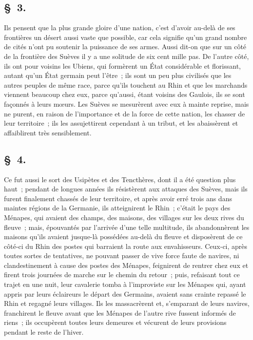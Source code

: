 \documentclass[french,twoside]{book} %
\begin{document}
\subsection[{§ 3.}]{ \textsc{§ 3.} }
\noindent Ils pensent que la plus grande gloire d’une nation, c’est d’avoir au-delà de ses frontières un désert aussi vaste que possible, car cela signifie qu’un grand nombre de cités n’ont pu soutenir la puissance de ses armes. Aussi dit-on que sur un côté de la frontière des Suèves il y a une solitude de six cent mille pas. De l’autre côté, ils ont pour voisins les Ubiens, qui formèrent un État considérable et florissant, autant qu’un État germain peut l’être ; ils sont un peu plus civilisés que les autres peuples de même race, parce qu’ils touchent au Rhin et que les marchands viennent beaucoup chez eux, parce qu’aussi, étant voisins des Gaulois, ils se sont façonnés à leurs mœurs. Les Suèves se mesurèrent avec eux à mainte reprise, mais ne purent, en raison de l’importance et de la force de cette nation, les chasser de leur territoire ; ils les assujettirent cependant à un tribut, et les abaissèrent et affaiblirent très sensiblement.
\subsection[{§ 4.}]{ \textsc{§ 4.} }
\noindent Ce fut aussi le sort des Usipètes et des Tencthères, dont il a été question plus haut ; pendant de longues années ils résistèrent aux attaques des Suèves, mais ils furent finalement chassés de leur territoire, et après avoir erré trois ans dans maintes régions de la Germanie, ils atteignirent le Rhin ; c’était le pays des Ménapes, qui avaient des champs, des maisons, des villages sur les deux rives du fleuve ; mais, épouvantés par l’arrivée d’une telle multitude, ils abandonnèrent les maisons qu’ils avaient jusque-là possédées au-delà du fleuve et disposèrent de ce côté-ci du Rhin des postes qui barraient la route aux envahisseurs. Ceux-ci, après toutes sortes de tentatives, ne pouvant passer de vive force faute de navires, ni clandestinement à cause des postes des Ménapes, feignirent de rentrer chez eux et firent trois journées de marche sur le chemin du retour ; puis, refaisant tout ce trajet en une nuit, leur cavalerie tomba à l’improviste sur les Ménapes qui, ayant appris par leurs éclaireurs le départ des Germains, avaient sans crainte repassé le Rhin et regagné leurs villages. Ils les massacrèrent et, s’emparant de leurs navires, franchirent le fleuve avant que les Ménapes de l’autre rive fussent informés de riens ; ils occupèrent toutes leurs demeures et vécurent de leurs provisions pendant le reste de l’hiver.
\end{document}
